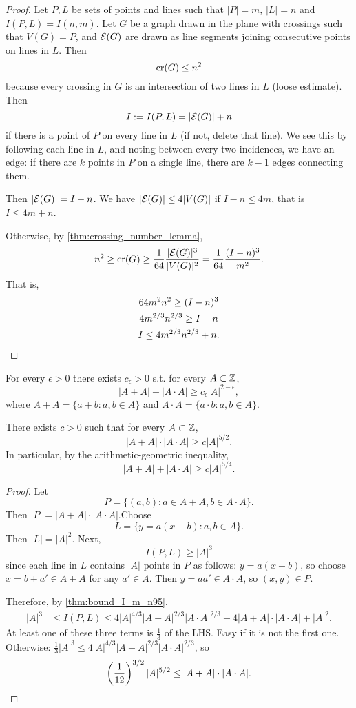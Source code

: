 \begin{proof}	
Let $P,L$ be sets of points and lines such that $|P| = m$, $|L| = n$ and $I(P,L) = I(n,m)$. Let $G$ be a graph drawn in the plane with crossings such that $V(G)  = P$, and $\mathcal{E}(G)$ are drawn as line segments joining consecutive points on lines in $L$. 
Then
\[
\operatorname{cr}(G)\leq n^2
\]
because every crossing in $G$ is an intersection of two lines in $L$ (loose estimate). Then
\[
I:=I(P,L) = |\mathcal{E}(G)| + n
\]
if there is a point of $P$ on every line in $L$ (if not, delete that line). We see this by following each line in $L$, and noting between every two incidences, we have an edge: if there are $k$ points in $P$ on a single line, there are $k-1$ edges connecting them.

Then $|\mathcal{E}(G)| = I -n$. We have $|\mathcal{E}(G)|\leq 4 |V(G)|$ if $I - n \leq 4m$, that is $I\leq 4m + n$.

Otherwise,  by \cref{thm:crossing_number_lemma},
\[
n^2 \geq \operatorname{cr} (G) \geq \frac{1}{64} \frac{|\mathcal{E}(G)|^3}{|V(G)|^2} = \frac{1}{64} \frac{(I-n)^3}{m^2}.
\]
That is, 
\begin{gather*}
64 m^2 n^2 \geq (I-n)^3\\
4 m^{2/3} n^{2/3}\geq I- n\\
I \leq 4m^{2/3}n^{2/3}+n.\qedhere
\end{gather*}
\end{proof}

\begin{conjecture*}
For every $\epsilon>0$ there exists $c_{\epsilon} > 0$ s.t. for every $A\subset \mathbb{Z}$,
\[
|A+A| + |A\cdot A| \geq c_{\epsilon} |A|^{2 - \epsilon},
\]
where $A+A = \{a+b: a,b\in A\}$ and $A\cdot A = \{a\cdot b: a,b\in A\}$.
\end{conjecture*}


\begin{theorem} \label{thm:96_elekes}
There exists $c>0$ such that for every $A\subset \mathbb{Z}$, 
\[
|A+A|\cdot |A\cdot A| \geq c |A|^{5/2}.
\]
In particular, by the arithmetic-geometric inequality,
\[
|A+A| + |A\cdot A| \geq c |A|^{5/4}.
\]
\end{theorem}
\begin{proof}	
Let 
\[
 P = \{(a,b):a \in A+A, b\in A\cdot A\}.
 \] Then $|P| =|A+A|\cdot |A\cdot A| $.Choose
\[
L = \{y = a(x-b): a,b\in A\}.
\]
Then $|L| = |A|^2$. Next, 
\[
 I(P,L) \geq |A|^3
 \] since each line in $L$ contains $|A|$ points in $P$ as follows: $y = a(x-b)$, so choose $x= b+a' \in A+A$ for any $a' \in A$. Then $y = aa' \in A\cdot A$, so $(x,y) \in P$.

Therefore, by \cref{thm:bound_I_m_n95},
\begin{align*}	
|A|^3 &\leq I(P,L) \leq 4 |A|^{4/3} |A+A|^{2/3}|A\cdot A|^{2/3} + 4|A+A| \cdot |A\cdot A| + |A|^2.
\end{align*}
At least one of these three terms is $\frac{1}{3}$ of the LHS. Easy if it is not the first one. Otherwise: $\frac{1}{3}|A|^3 \leq 4 |A|^{4/3} |A+A|^{2/3} |A\cdot A|^{2/3}$, so
\[
\left(\frac{1}{12}\right)^{3/2}|A|^{5/2} \leq |A+A| \cdot |A\cdot A|. \qedhere
\]
\end{proof}